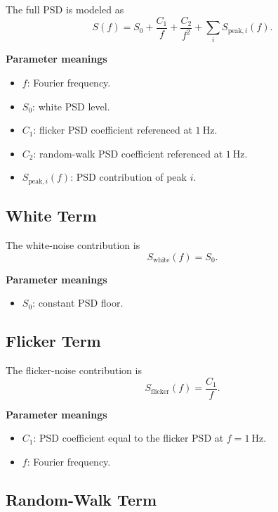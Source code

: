 \documentclass[11pt,a4paper]{article}
\begin{document}
The full PSD is modeled as
\begin{equation}
  S(f) = S_0 + \frac{C_1}{f} + \frac{C_2}{f^2} + \sum_i S_{\mathrm{peak},i}(f).
\end{equation}

\textbf{Parameter meanings}
\begin{itemize}[leftmargin=1.5em]
  \item $f$: Fourier frequency.
  \item $S_0$: white PSD level.
  \item $C_1$: flicker PSD coefficient referenced at $1~\mathrm{Hz}$.
  \item $C_2$: random-walk PSD coefficient referenced at $1~\mathrm{Hz}$.
  \item $S_{\mathrm{peak},i}(f)$: PSD contribution of peak $i$.
\end{itemize}

\subsection{White Term}

The white-noise contribution is
\begin{equation}
  S_{\mathrm{white}}(f) = S_0.
\end{equation}

\textbf{Parameter meanings}
\begin{itemize}[leftmargin=1.5em]
  \item $S_0$: constant PSD floor.
\end{itemize}

\subsection{Flicker Term}

The flicker-noise contribution is
\begin{equation}
  S_{\mathrm{flicker}}(f) = \frac{C_1}{f}.
\end{equation}

\textbf{Parameter meanings}
\begin{itemize}[leftmargin=1.5em]
  \item $C_1$: PSD coefficient equal to the flicker PSD at $f=1~\mathrm{Hz}$.
  \item $f$: Fourier frequency.
\end{itemize}

\subsection{Random-Walk Term}
\end{document}
